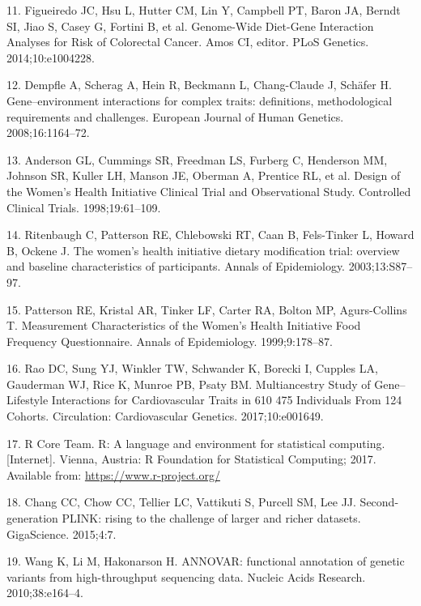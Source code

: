 \documentclass[]{article}
\begin{document}
\leavevmode\hypertarget{ref-Figueiredo2014}{}%
11. Figueiredo JC, Hsu L, Hutter CM, Lin Y, Campbell PT, Baron JA,
Berndt SI, Jiao S, Casey G, Fortini B, et al. Genome-Wide Diet-Gene
Interaction Analyses for Risk of Colorectal Cancer. Amos CI, editor.
PLoS Genetics. 2014;10:e1004228.

\leavevmode\hypertarget{ref-Dempfle2008}{}%
12. Dempfle A, Scherag A, Hein R, Beckmann L, Chang-Claude J, Schäfer H.
Gene--environment interactions for complex traits: definitions,
methodological requirements and challenges. European Journal of Human
Genetics. 2008;16:1164--72.

\leavevmode\hypertarget{ref-Anderson1998}{}%
13. Anderson GL, Cummings SR, Freedman LS, Furberg C, Henderson MM,
Johnson SR, Kuller LH, Manson JE, Oberman A, Prentice RL, et al. Design
of the Women's Health Initiative Clinical Trial and Observational Study.
Controlled Clinical Trials. 1998;19:61--109.

\leavevmode\hypertarget{ref-Ritenbaugh2003}{}%
14. Ritenbaugh C, Patterson RE, Chlebowski RT, Caan B, Fels-Tinker L,
Howard B, Ockene J. The women's health initiative dietary modification
trial: overview and baseline characteristics of participants. Annals of
Epidemiology. 2003;13:S87--97.

\leavevmode\hypertarget{ref-Patterson1999}{}%
15. Patterson RE, Kristal AR, Tinker LF, Carter RA, Bolton MP,
Agurs-Collins T. Measurement Characteristics of the Women's Health
Initiative Food Frequency Questionnaire. Annals of Epidemiology.
1999;9:178--87.

\leavevmode\hypertarget{ref-Rao2017}{}%
16. Rao DC, Sung YJ, Winkler TW, Schwander K, Borecki I, Cupples LA,
Gauderman WJ, Rice K, Munroe PB, Psaty BM. Multiancestry Study of
Gene--Lifestyle Interactions for Cardiovascular Traits in 610 475
Individuals From 124 Cohorts. Circulation: Cardiovascular Genetics.
2017;10:e001649.

\leavevmode\hypertarget{ref-RCoreTeam2017}{}%
17. R Core Team. R: A language and environment for statistical
computing. {[}Internet{]}. Vienna, Austria: R Foundation for Statistical
Computing; 2017. Available from: \url{https://www.r-project.org/}

\leavevmode\hypertarget{ref-Chang2015}{}%
18. Chang CC, Chow CC, Tellier LC, Vattikuti S, Purcell SM, Lee JJ.
Second-generation PLINK: rising to the challenge of larger and richer
datasets. GigaScience. 2015;4:7.

\leavevmode\hypertarget{ref-Wang2010}{}%
19. Wang K, Li M, Hakonarson H. ANNOVAR: functional annotation of
genetic variants from high-throughput sequencing data. Nucleic Acids
Research. 2010;38:e164--4.
\end{document}
